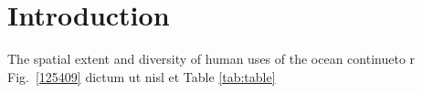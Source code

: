 \section{Introduction}
\label{introduction}

The spatial extent and diversity of human uses of the ocean continueto r Fig.~\ref{125409} dictum ut nisl et Table \ref{tab:table}
